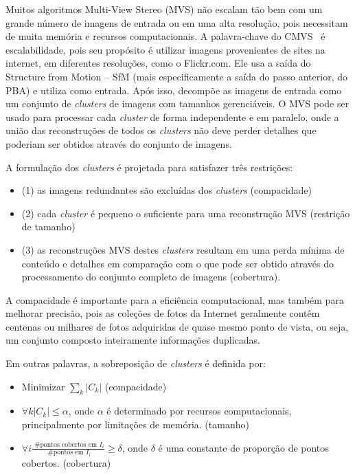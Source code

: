 \begin{itemize}
Muitos algoritmos Multi-View Stereo (MVS) não escalam tão bem com um grande número de imagens de entrada ou em uma alta resolução, pois necessitam de muita memória e recursos computacionais. A palavra-chave do CMVS~\cite{visualSfMPMVS,wu2013towards,li2013improving} é escalabilidade, pois seu propósito é utilizar imagens provenientes de sites na internet, em diferentes resoluções, como o Flickr.com.  
Ele usa a saída do Structure from Motion -- SfM (mais especificamente a saída do passo anterior, do PBA) e utiliza como entrada. Após isso, decompõe as imagens de entrada como um conjunto de \emph{clusters} de imagens com tamanhos gerenciáveis. O MVS pode ser usado para processar cada \emph{cluster} de forma independente e em paralelo, onde a união das reconstruções de todos os \emph{clusters} não deve perder detalhes que poderiam ser obtidos através do conjunto de imagens.

A formulação dos \emph{clusters} é projetada para satisfazer três restrições: 
\begin{itemize}
\item{(1) as imagens redundantes são excluídas dos \emph{clusters} (compacidade)}
\item{(2) cada \emph{cluster} é pequeno o suficiente para uma reconstrução MVS (restrição de tamanho)}
\item{(3) as reconstruções MVS destes \emph{clusters} resultam em uma perda mínima de conteúdo e detalhes em comparação com o que pode ser obtido através do processamento do conjunto completo de imagens (cobertura).}
\end{itemize}

A compacidade é importante para a eficiência computacional, mas também para melhorar precisão, pois as coleções de fotos da Internet geralmente contêm centenas ou milhares de fotos adquiridas de quase mesmo ponto de vista, ou seja, um conjunto composto inteiramente informações duplicadas.

Em outras palavras, a sobreposição de \emph{clusters} é definida por:

\begin{itemize}
\item Minimizar $\sum_{k} |C_k|$ (compacidade)
\item $\forall k |C_k| \le \alpha$, onde $\alpha$ é determinado por recursos computacionais, principalmente por limitações de memória. (tamanho)
\item $\forall i \frac{\text{ \# pontos cobertos em } I_i}{\text{ \# pontos em } I_i} \ge \delta$, onde $\delta$ é uma constante de proporção de pontos cobertos. (cobertura)
\end{itemize}


\end{itemize}
